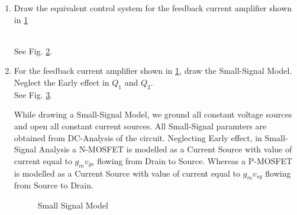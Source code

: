 \begin{enumerate}[label=\thesubsection.\arabic*.,ref=\thesubsection.\theenumi]

\item Draw the equivalent control system for the feedback current amplifier shown in \ref{fig:ee18btech11014_Input}
\renewcommand{\thefigure}{\theenumi.\arabic{figure}}
\begin{figure}[h!]
	\begin{center}
		\resizebox{\columnwidth/1}{!}{}
	\end{center}
	\caption{}
	\label{fig:ee18btech11014_Input}
\end{figure}
\\
\solution See Fig. 	\ref{fig:ee18btech11014_Control_System}.

\begin{figure}[ht!]
	\begin{center}
		\resizebox{\columnwidth}{!}{}
	\end{center}
	\caption{}
	\label{fig:ee18btech11014_Control_System}
\end{figure}
\renewcommand{\thefigure}{\theenumi}
\item For the feedback current amplifier shown in \ref{fig:ee18btech11014_Input}, draw the Small-Signal Model. Neglect the Early effect in $Q_{1}$ and $Q_{2}$.\\
\solution See Fig. 	\ref{fig:ee18btech11014_Small_Signal}.

While drawing a Small-Signal Model, we ground all constant voltage sources and open all constant current sources. All Small-Signal paramters are obtained from DC-Analysis of the circuit. Neglecting Early effect, in Small-Signal Analysis a N-MOSFET is modelled as a Current Source with value of current equal to $g_{m}v_{gs}$ flowing from Drain to Source. Whereas a P-MOSFET is modelled as a Current Source with value of current equal to $g_{m}v_{sg}$ flowing from Source to Drain.
\begin{figure}[h!]
	\begin{center}
		\resizebox{\columnwidth/1}{!}{}
	\end{center}
	\caption{Small Signal Model}
	\label{fig:ee18btech11014_Small_Signal}
\end{figure}



\end{enumerate}
